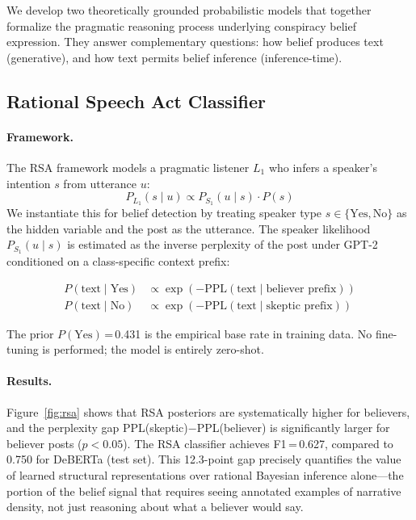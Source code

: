 \documentclass[11pt]{article}
\begin{document}
We develop two theoretically grounded probabilistic models that together
formalize the pragmatic reasoning process underlying conspiracy belief
expression.
They answer complementary questions: how belief produces text (generative),
and how text permits belief inference (inference-time).

\subsection{Rational Speech Act Classifier}
\label{sec:rsa}

\paragraph{Framework.}
The RSA framework \citep{goodman2016pragmatics} models a pragmatic
listener $L_1$ who infers a speaker's intention $s$ from utterance $u$:
\begin{equation}
  P_{L_1}(s \mid u) \propto P_{S_1}(u \mid s) \cdot P(s)
\end{equation}
We instantiate this for belief detection by treating speaker type
$s \in \{\text{Yes}, \text{No}\}$ as the hidden variable and the post as
the utterance.
The speaker likelihood $P_{S_1}(u \mid s)$ is estimated as the inverse
perplexity of the post under GPT-2 conditioned on a class-specific
context prefix:

\begin{align}
  P(\text{text} \mid \text{Yes}) &\propto \exp(-\text{PPL}(\text{text}
    \mid \text{believer prefix})) \nonumber \\
  P(\text{text} \mid \text{No}) &\propto \exp(-\text{PPL}(\text{text}
    \mid \text{skeptic prefix}))
\end{align}

The prior $P(\text{Yes})$\,=\,0.431 is the empirical base rate in
training data.
No fine-tuning is performed; the model is entirely zero-shot.

\paragraph{Results.}
Figure~\ref{fig:rsa} shows that RSA posteriors are systematically higher
for believers, and the perplexity gap PPL(skeptic)$-$PPL(believer) is
significantly larger for believer posts ($p < 0.05$).
The RSA classifier achieves F1\,=\,0.627, compared to 0.750 for
DeBERTa (test set).
This 12.3-point gap precisely quantifies the value of learned structural
representations over rational Bayesian inference alone---the portion of
the belief signal that requires seeing annotated examples of narrative
density, not just reasoning about what a believer would say.
\end{document}
